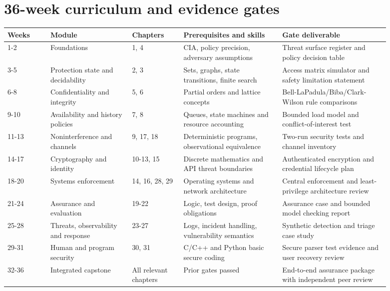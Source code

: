\documentclass[10pt,letterpaper]{article}
\begin{document}
\section{36-week curriculum and evidence gates}
\begin{longtable}{@{}p{0.10\linewidth}p{0.19\linewidth}p{0.12\linewidth}p{0.23\linewidth}p{0.25\linewidth}@{}}
\toprule Weeks & Module & Chapters & Prerequisites and skills & Gate deliverable\\ \midrule\endhead
1-2 & Foundations & 1, 4 & CIA, policy precision, adversary assumptions & Threat surface register and policy decision table\\ \midrule
3-5 & Protection state and decidability & 2, 3 & Sets, graphs, state transitions, finite search & Access matrix simulator and safety limitation statement\\ \midrule
6-8 & Confidentiality and integrity & 5, 6 & Partial orders and lattice concepts & Bell-LaPadula/Biba/Clark-Wilson rule comparisons\\ \midrule
9-10 & Availability and history policies & 7, 8 & Queues, state machines and resource accounting & Bounded load model and conflict-of-interest test\\ \midrule
11-13 & Noninterference and channels & 9, 17, 18 & Deterministic programs, observational equivalence & Two-run security tests and channel inventory\\ \midrule
14-17 & Cryptography and identity & 10-13, 15 & Discrete mathematics and API threat boundaries & Authenticated encryption and credential lifecycle plan\\ \midrule
18-20 & Systems enforcement & 14, 16, 28, 29 & Operating systems and network architecture & Central enforcement and least-privilege architecture review\\ \midrule
21-24 & Assurance and evaluation & 19-22 & Logic, test design, proof obligations & Assurance case and bounded model checking report\\ \midrule
25-28 & Threats, observability and response & 23-27 & Logs, incident handling, vulnerability semantics & Synthetic detection and triage case study\\ \midrule
29-31 & Human and program security & 30, 31 & C/C++ and Python basic secure coding & Secure parser test evidence and user recovery review\\ \midrule
32-36 & Integrated capstone & All relevant chapters & Prior gates passed & End-to-end assurance package with independent peer review\\ \midrule
\bottomrule
\end{longtable}
\end{document}
